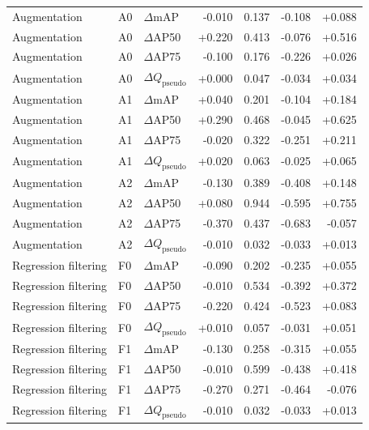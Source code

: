 \begin{table}[htbp]
\begin{tabular}{lllrrrr}
\addlinespace
Augmentation & A0 & $\Delta$mAP & -0.010 & 0.137 & -0.108 & +0.088 \\
Augmentation & A0 & $\Delta$AP50 & +0.220 & 0.413 & -0.076 & +0.516 \\
Augmentation & A0 & $\Delta$AP75 & -0.100 & 0.176 & -0.226 & +0.026 \\
Augmentation & A0 & $\Delta Q_{\mathrm{pseudo}}$ & +0.000 & 0.047 & -0.034 & +0.034 \\
Augmentation & A1 & $\Delta$mAP & +0.040 & 0.201 & -0.104 & +0.184 \\
Augmentation & A1 & $\Delta$AP50 & +0.290 & 0.468 & -0.045 & +0.625 \\
Augmentation & A1 & $\Delta$AP75 & -0.020 & 0.322 & -0.251 & +0.211 \\
Augmentation & A1 & $\Delta Q_{\mathrm{pseudo}}$ & +0.020 & 0.063 & -0.025 & +0.065 \\
Augmentation & A2 & $\Delta$mAP & -0.130 & 0.389 & -0.408 & +0.148 \\
Augmentation & A2 & $\Delta$AP50 & +0.080 & 0.944 & -0.595 & +0.755 \\
Augmentation & A2 & $\Delta$AP75 & -0.370 & 0.437 & -0.683 & -0.057 \\
Augmentation & A2 & $\Delta Q_{\mathrm{pseudo}}$ & -0.010 & 0.032 & -0.033 & +0.013 \\
\addlinespace
Regression filtering & F0 & $\Delta$mAP & -0.090 & 0.202 & -0.235 & +0.055 \\
Regression filtering & F0 & $\Delta$AP50 & -0.010 & 0.534 & -0.392 & +0.372 \\
Regression filtering & F0 & $\Delta$AP75 & -0.220 & 0.424 & -0.523 & +0.083 \\
Regression filtering & F0 & $\Delta Q_{\mathrm{pseudo}}$ & +0.010 & 0.057 & -0.031 & +0.051 \\
Regression filtering & F1 & $\Delta$mAP & -0.130 & 0.258 & -0.315 & +0.055 \\
Regression filtering & F1 & $\Delta$AP50 & -0.010 & 0.599 & -0.438 & +0.418 \\
Regression filtering & F1 & $\Delta$AP75 & -0.270 & 0.271 & -0.464 & -0.076 \\
Regression filtering & F1 & $\Delta Q_{\mathrm{pseudo}}$ & -0.010 & 0.032 & -0.033 & +0.013 \\
\bottomrule
\end{tabular}
\end{table}
